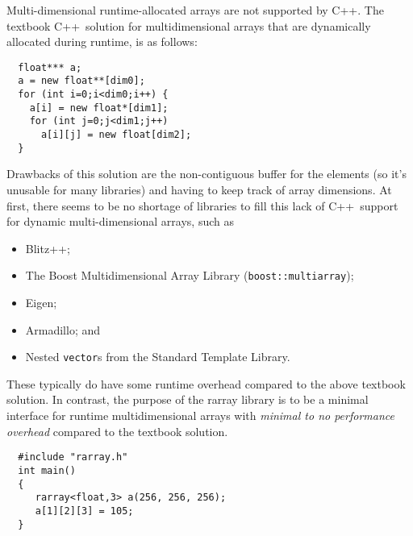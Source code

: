 \documentclass[12pt,twoside]{article}
\newcommand{\cxx}{C{++}}
\begin{document}
Multi-dimensional runtime-allocated arrays are not supported by \cxx.
The textbook \cxx\ solution for multidimensional arrays that are
dynamically allocated during runtime, is as follows:
\vspace{-5pt}\begin{framed}\vspace{-14pt}%
\begin{verbatim}
  float*** a;
  a = new float**[dim0];
  for (int i=0;i<dim0;i++) {
    a[i] = new float*[dim1];
    for (int j=0;j<dim1;j++) 
      a[i][j] = new float[dim2];
  }
\end{verbatim}%
\vspace{-12pt}\end{framed}\vspace{-5pt}%
Drawbacks of this solution are the non-contiguous buffer for the
elements (so it's unusable for many libraries) and having to keep
track of array dimensions.
At first, there seems to be no shortage of libraries to fill this
lack of \cxx\ support for dynamic multi-dimensional arrays, such as
\begin{itemize}\itemsep 0pt \parskip 0pt
\item Blitz++;
\item The Boost Multidimensional Array Library (\texttt{boost::multiarray}); 
\item Eigen;
\item Armadillo; and
\item Nested \texttt{vector}s from the Standard Template Library.
\end{itemize}
These typically do have some runtime overhead compared to the above
textbook solution. In contrast, the purpose of the rarray
library is to be a minimal interface for runtime multidimensional arrays with
\emph{minimal to no performance overhead} compared to the textbook solution.

\begin{framed}\vspace{-14pt}%
\begin{verbatim}
  #include "rarray.h"
  int main() 
  {
     rarray<float,3> a(256, 256, 256);
     a[1][2][3] = 105;
  }
\end{verbatim}%
\vspace{-14pt}%
\end{framed}
\end{document}
